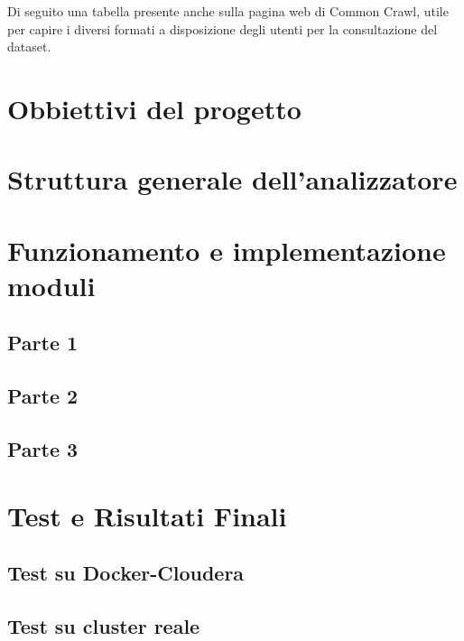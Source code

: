 \documentclass{article}
\begin{document}
Di seguito una tabella presente anche sulla pagina web di Common Crawl, utile per capire i diversi formati a disposizione degli utenti per la consultazione del dataset.

\commonCrawlFilesTable

\section{Obbiettivi del progetto}

\section{Struttura generale dell'analizzatore}

\section{Funzionamento e implementazione moduli}
\subsection{Parte 1}
\subsection{Parte 2}
\subsection{Parte 3}

\section{Test e Risultati Finali}
\subsection{Test su Docker-Cloudera}
\subsection{Test su cluster reale}


\end{document}
